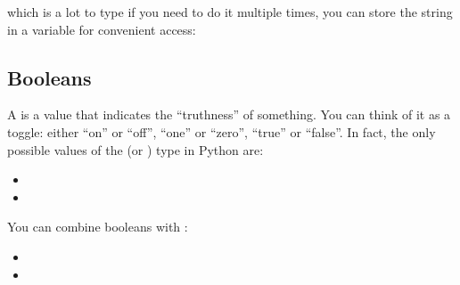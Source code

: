 which is a lot to type if you need to do it multiple times, you can
store the string in a variable for convenient access:

\begin{sphinxVerbatim}[commandchars=\\\{\}]
  
\end{sphinxVerbatim}


\subsection{Booleans}
\label{\detokenize{lesson/prg/python_intro:booleans}}
A  is a value that indicates the ``truthness'' of something.
You can think of it as a toggle: either ``on'' or ``off'', ``one'' or
``zero'', ``true'' or ``false''.  In fact, the only possible values of the
 (or ) type in Python are:
\begin{itemize}
\item {} 

\item {} 

\end{itemize}

You can combine booleans with :
\begin{itemize}
\item {} 

\item {} 

\end{itemize}

\begin{sphinxVerbatim}[commandchars=\\\{\}]
  
  
  
  
  
  
\end{sphinxVerbatim}


